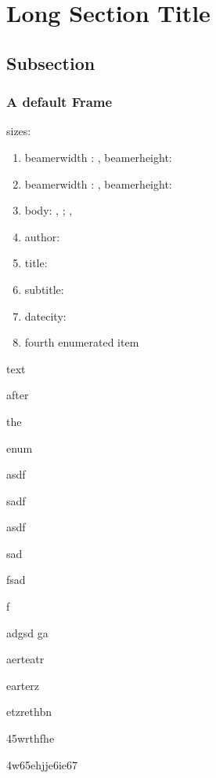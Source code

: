 \documentclass[german,aspectratio=169,notoc,draft]{tudbeamer}%
\begin{document}
\section[ShortSection]{Long Section Title}	
\subsection{Subsection}
\begin{frame}[allowframebreaks]
	\frametitle{A default Frame}
	sizes:
	\begin{enumerate}
		\item beamerwidth : \the\paperwidth, beamerheight: \the\paperheight
		\item beamerwidth : \number\paperwidth, beamerheight:\number\paperheight
		\item body: \the\bodyx, \the\bodyy; \the\bodywidth, \the\bodywidth
		\item author: \insertauthor
		\item title: \inserttitle
		\item subtitle: \insertsubtitle
		\item datecity: \insertdatecity
		\item fourth enumerated item
	\end{enumerate}
	text 

	after 

	the 

	enum

	asdf

	sadf
	
	asdf
	
	sad
	
	fsad
	
	f

	adgsd
	ga

	aerteatr

	earterz

	etzrethbn

	45wrthfhe

	4w65ehjje6ie67
\end{frame}
\end{document}
